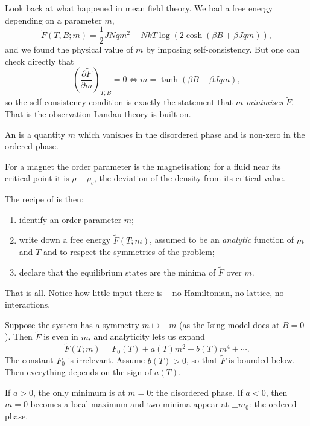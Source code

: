 \documentclass[a4paper]{scrartcl}
\begin{document}
Look back at what happened in mean field theory. We had a free energy depending on a parameter $m$,
$$
\tilde F(T,B;m) = \frac 12 JNqm^2 - Nk T\log\left(2\cosh(\beta B + \beta Jqm)\right),
$$
and we found the physical value of $m$ by imposing self-consistency. But one can check directly that
$$
\left(\frac{\partial \tilde F}{\partial m}\right)_{T,B} = 0 \iff m = \tanh(\beta B + \beta Jqm),
$$
so the self-consistency condition is exactly the statement that $m$ \emph{minimises} $\tilde F$. That is the observation Landau theory is built on.

\begin{definition}
	An  is a quantity $m$ which vanishes in the disordered phase and is non-zero in the ordered phase.
\end{definition}

For a magnet the order parameter is the magnetisation; for a fluid near its critical point it is $\rho - \rho_c$, the deviation of the density from its critical value.

The recipe of  is then:
\begin{enumerate}[label=(\roman*)]
	\item identify an order parameter $m$;
	\item write down a free energy $\tilde F(T; m)$, assumed to be an \emph{analytic} function of $m$ and $T$ and to respect the symmetries of the problem;
	\item declare that the equilibrium states are the minima of $\tilde F$ over $m$.
\end{enumerate}
That is all. Notice how little input there is -- no Hamiltonian, no lattice, no interactions.

Suppose the system has a symmetry $m \mapsto -m$ (as the Ising model does at $B = 0$). Then $\tilde F$ is even in $m$, and analyticity lets us expand
$$
\tilde F(T;m) = F_0(T) + a(T)m^2 + b(T)m^4 + \cdots.
$$
The constant $F_0$ is irrelevant. Assume $b(T)>0$, so that $\tilde F$ is bounded below. Then everything depends on the sign of $a(T)$.

If $a > 0$, the only minimum is at $m = 0$: the disordered phase. If $a<0$, then $m=0$ becomes a local maximum and two minima appear at $\pm m_0$: the ordered phase.
\end{document}
